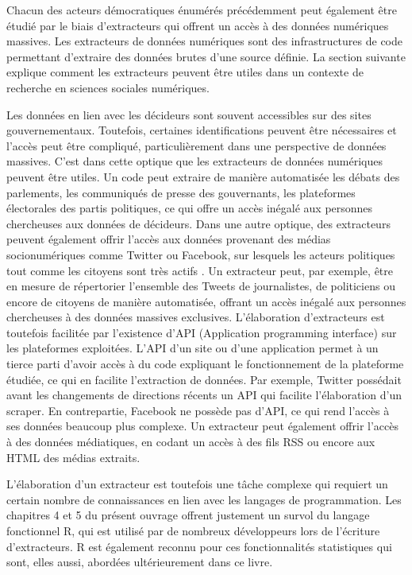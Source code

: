 \documentclass[
  letterpaper,
]{scrbook}
\begin{document}
Chacun des acteurs démocratiques énumérés précédemment peut également
être étudié par le biais d'extracteurs qui offrent un accès à des
données numériques massives. Les extracteurs de données numériques sont
des infrastructures de code permettant d'extraire des données brutes
d'une source définie. La section suivante explique comment les
extracteurs peuvent être utiles dans un contexte de recherche en
sciences sociales numériques.

Les données en lien avec les décideurs sont souvent accessibles sur des
sites gouvernementaux. Toutefois, certaines identifications peuvent être
nécessaires et l'accès peut être compliqué, particulièrement dans une
perspective de données massives. C'est dans cette optique que les
extracteurs de données numériques peuvent être utiles. Un code peut
extraire de manière automatisée les débats des parlements, les
communiqués de presse des gouvernants, les plateformes électorales des
partis politiques, ce qui offre un accès inégalé aux personnes
chercheuses aux données de décideurs. Dans une autre optique, des
extracteurs peuvent également offrir l'accès aux données provenant des
médias socionumériques comme Twitter ou Facebook, sur lesquels les
acteurs politiques tout comme les citoyens sont très actifs . Un
extracteur peut, par exemple, être en mesure de répertorier l'ensemble
des Tweets de journalistes, de politiciens ou encore de citoyens de
manière automatisée, offrant un accès inégalé aux personnes chercheuses
à des données massives exclusives. L'élaboration d'extracteurs est
toutefois facilitée par l'existence d'API (Application programming
interface) sur les plateformes exploitées. L'API d'un site ou d'une
application permet à un tierce parti d'avoir accès à du code expliquant
le fonctionnement de la plateforme étudiée, ce qui en facilite
l'extraction de données. Par exemple, Twitter possédait avant les
changements de directions récents un API qui facilite l'élaboration d'un
scraper. En contrepartie, Facebook ne possède pas d'API, ce qui rend
l'accès à ses données beaucoup plus complexe. Un extracteur peut
également offrir l'accès à des données médiatiques, en codant un accès à
des fils RSS ou encore aux HTML des médias extraits.

L'élaboration d'un extracteur est toutefois une tâche complexe qui
requiert un certain nombre de connaissances en lien avec les langages de
programmation. Les chapitres 4 et 5 du présent ouvrage offrent justement
un survol du langage fonctionnel R, qui est utilisé par de nombreux
développeurs lors de l'écriture d'extracteurs. R est également reconnu
pour ces fonctionnalités statistiques qui sont, elles aussi, abordées
ultérieurement dans ce livre.
\end{document}
